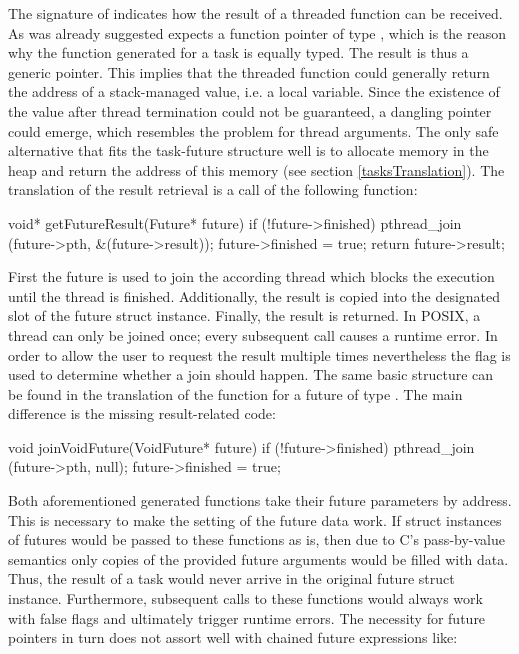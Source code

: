 The signature of  indicates how the result of a threaded function can be received. As was already suggested  expects a function pointer of type , which is the reason why the function generated for a task is equally typed. The result is thus a generic  pointer. This implies that the threaded function could generally return the address of a stack-managed value, i.e. a local variable. Since the existence of the value after thread termination could not be guaranteed, a dangling pointer \cite{UnderstandingAndUsingCPointers} could emerge, which resembles the problem for thread arguments. The only safe alternative that fits the task-future structure well is to allocate memory in the heap and return the address of this memory (see section \ref{tasksTranslation}). The translation of the result retrieval is a call of the following function:

\begin{ccode}
void* getFutureResult(Future* future) { 
  if (!future->finished) { 
    pthread_join (future->pth, &(future->result)); 
    future->finished = true; 
  } 
  return future->result; 
} 
\end{ccode}
First the future is used to join the according thread which blocks the execution until the thread is finished. Additionally, the result is copied into the designated slot of the future struct instance. Finally, the result is returned. In POSIX, a thread can only be joined once; every subsequent call causes a runtime error. In order to allow the user to request the result multiple times nevertheless the  flag is used to determine whether a join should happen. The same basic structure can be found in the translation of the  function for a future of type . The main difference is the missing result-related code:
\begin{ccode}
void joinVoidFuture(VoidFuture* future) { 
  if (!future->finished) { 
    pthread_join (future->pth, null); 
    future->finished = true; 
  }
}
\end{ccode}
Both aforementioned generated functions take their future parameters by address. This is necessary to make the setting of the future data work. If struct instances of futures would be passed to these functions as is, then due to C's pass-by-value semantics only copies of the provided future arguments would be filled with data. Thus, the result of a task would never arrive in the original future struct instance. Furthermore, subsequent calls to these functions would always work with false  flags and ultimately trigger runtime errors. The necessity for future pointers in turn does not assort well with chained future expressions like:

